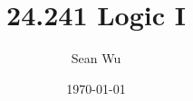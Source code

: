 \documentclass[letterpaper,12pt]{article}
\begin{document}
\title{24.241 Logic I}
\author{Sean Wu}
\date{\today}
\maketitle

\tableofcontents

\pagebreak


\end{document}

